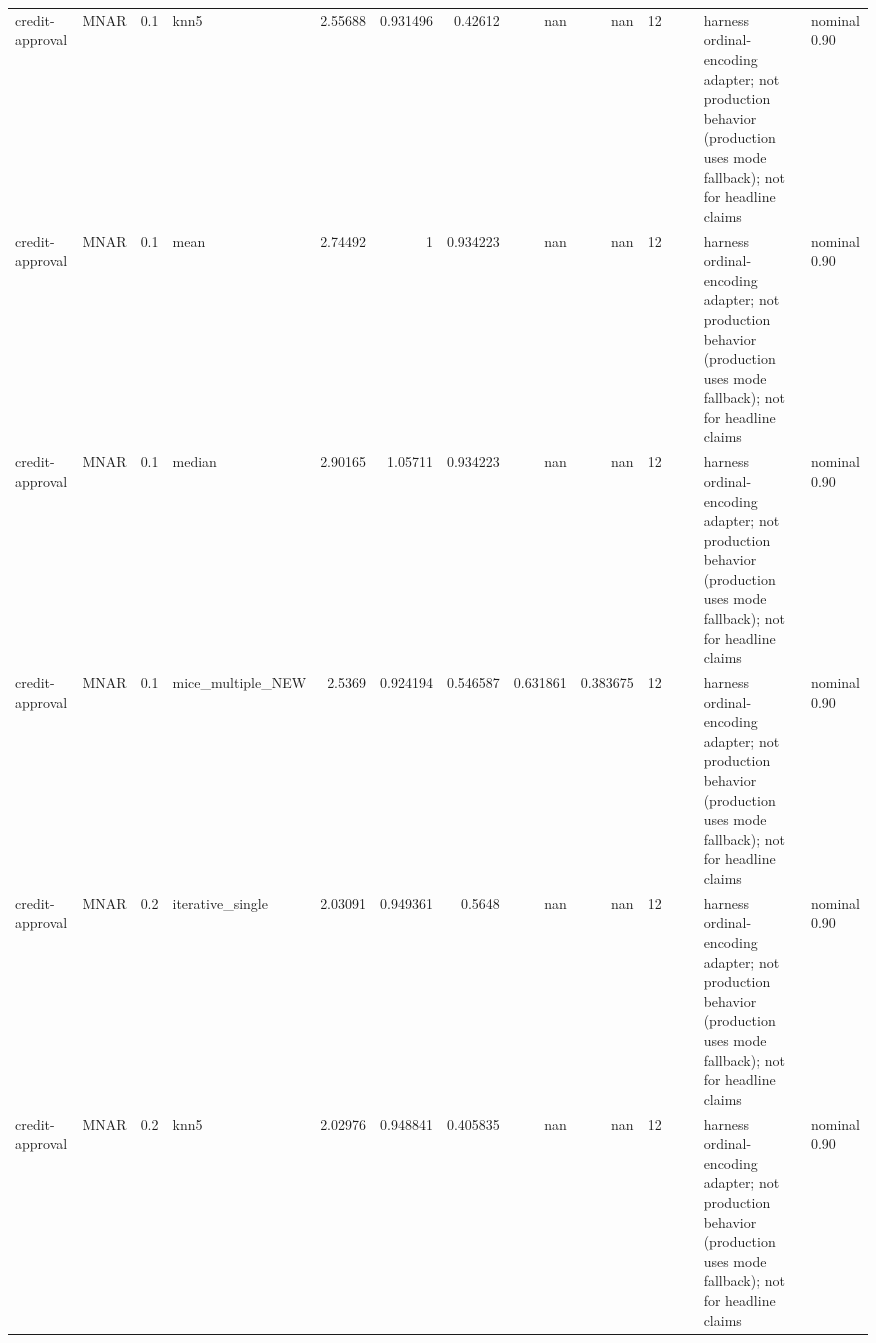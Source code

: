 \begin{table}[ht]
\begin{tabular}{llrlrrrrrrllll}
 credit-approval      & MNAR        &         0.1 & knn5              &       2.55688  &             0.931496 &                 0.42612  &                     nan        &                       nan        &        12 &                    &                                         & harness ordinal-encoding adapter; not production behavior (production uses mode fallback); not for headline claims & nominal 0.90              \\
 credit-approval      & MNAR        &         0.1 & mean              &       2.74492  &             1        &                 0.934223 &                     nan        &                       nan        &        12 &                    &                                         & harness ordinal-encoding adapter; not production behavior (production uses mode fallback); not for headline claims & nominal 0.90              \\
 credit-approval      & MNAR        &         0.1 & median            &       2.90165  &             1.05711  &                 0.934223 &                     nan        &                       nan        &        12 &                    &                                         & harness ordinal-encoding adapter; not production behavior (production uses mode fallback); not for headline claims & nominal 0.90              \\
 credit-approval      & MNAR        &         0.1 & mice\_multiple\_NEW &       2.5369   &             0.924194 &                 0.546587 &                       0.631861 &                         0.383675 &        12 &                    &                                         & harness ordinal-encoding adapter; not production behavior (production uses mode fallback); not for headline claims & nominal 0.90              \\
 credit-approval      & MNAR        &         0.2 & iterative\_single  &       2.03091  &             0.949361 &                 0.5648   &                     nan        &                       nan        &        12 &                    &                                         & harness ordinal-encoding adapter; not production behavior (production uses mode fallback); not for headline claims & nominal 0.90              \\
 credit-approval      & MNAR        &         0.2 & knn5              &       2.02976  &             0.948841 &                 0.405835 &                     nan        &                       nan        &        12 &                    &                                         & harness ordinal-encoding adapter; not production behavior (production uses mode fallback); not for headline claims & nominal 0.90              \\

\end{tabular}
\end{table}

